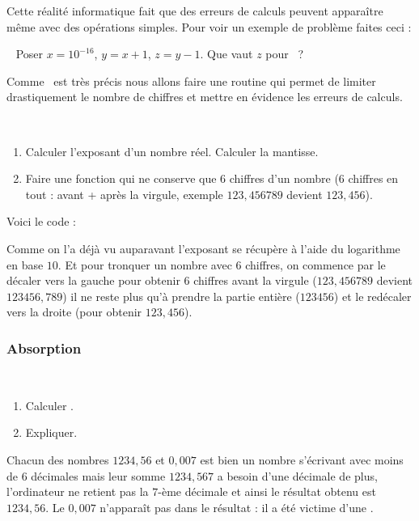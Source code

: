 \documentclass[class=report,crop=false]{standalone}
\begin{document}
Cette réalité informatique fait que des erreurs de calculs peuvent
apparaître même avec des opérations simples.
Pour voir un exemple de problème faites ceci :
\begin{tp}~
Poser $x=10^{-16}$, $y=x+1$, $z=y-1$. Que vaut $z$ pour \Python \ ?
\end{tp}

Comme \Python\ est très précis nous allons faire une routine qui permet
de limiter drastiquement le nombre de chiffres et mettre en évidence les erreurs de calculs.
\begin{tp}~
\begin{enumerate}
  \item Calculer l'exposant d'un nombre réel. Calculer la mantisse.
  \item Faire une fonction qui ne conserve que $6$ chiffres d'un nombre ($6$ chiffres en tout : avant + après la virgule, exemple
  $123,456789$ devient $123,456$).
\end{enumerate}
\end{tp}



Voici le code :

Comme on l'a déjà vu auparavant l'exposant se récupère à l'aide du logarithme en base $10$.
Et pour tronquer un nombre avec $6$ chiffres, on commence par le décaler vers la gauche pour obtenir $6$ chiffres avant la virgule
($123,456789$ devient $123456,789$) il ne reste plus qu'à prendre la partie entière ($123456$) et le redécaler vers la droite
(pour obtenir $123,456$).

\subsubsection{Absorption}

\begin{tp}~
\begin{enumerate}
  \item Calculer .
  \item Expliquer.
\end{enumerate}
\end{tp}

Chacun des nombres $1234,56$ et $0,007$ est bien un nombre s'écrivant avec moins de $6$ décimales
mais leur somme $1234,567$ a besoin d'une décimale de plus, l'ordinateur ne retient pas la $7$-ème décimale
et ainsi le résultat obtenu est $1234,56$. Le $0,007$ n'apparaît pas dans le résultat : il a été victime d'une .
\end{document}
